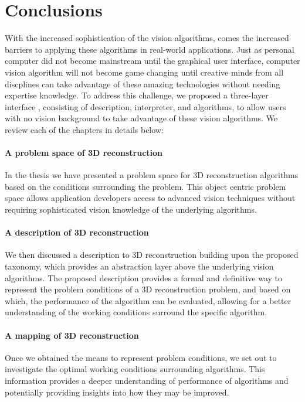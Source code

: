 
\chapter{Conclusions}
\label{ch:conclusion}
With the increased sophistication of the vision algorithms, comes the increased barriers to applying these algorithms in real-world applications. Just as personal computer did not become mainstream until the graphical user interface, computer vision algorithm will not become game changing until creative minds from all discplines can take advantage of these amazing technologies without needing expertise knowledge. To address this challenge, we proposed a three-layer interface , consisting of description, interpreter, and algorithms, to allow users with no vision background to take advantage of these vision algorithms. We review each of the chapters in details below:

\subsubsection{A problem space of 3D reconstruction}
In the thesis we have presented a problem space for 3D reconstruction algorithms based on the conditions surrounding the problem. This object centric problem space allows application developers access to advanced vision techniques without requiring sophisticated vision knowledge of the underlying algorithms. 

\subsubsection{A description of 3D reconstruction}
We then discussed a description to 3D reconstruction building upon the proposed taxonomy, which provides an abstraction layer above the underlying vision algorithms. The proposed description provides a formal and definitive way to represent the problem conditions of a 3D reconstruction problem, and based on which, the performance of the algorithm can be evaluated, allowing for a better understanding of the working conditions surround the specific algorithm. 

\subsubsection{A mapping of 3D reconstruction}
Once we obtained the means to represent problem conditions, we set out to investigate the optimal working conditions surrounding algorithms. This information provides a deeper understanding of performance of algorithms and potentially providing insights into how they may be improved. 

